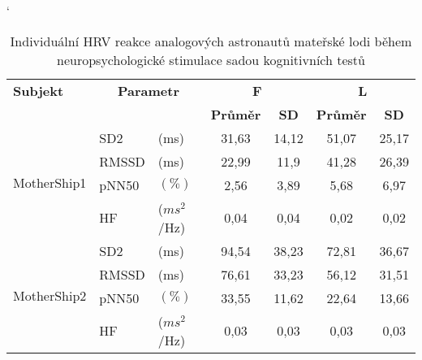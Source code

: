 \begin{table}[h]
    \catcode`
    \footnotesize
    \centering
    \caption{Individuální HRV reakce analogových astronautů mateřské lodi během neuropsychologické stimulace sadou kognitivních testů}
    \begin{threeparttable}
        \begin{tabular*}{\linewidth}{@{\extracolsep{\fill}} lllcccc @{}}
            \toprule
            \textbf{Subjekt}                & \multicolumn{2}{c}{\textbf{Parametr}} & \multicolumn{2}{c}{\textbf{F}} & \multicolumn{2}{c}{\textbf{L}}                                               \\ \cmidrule(rl){4-5} \cmidrule(rl){6-7}
            &                                       &                                & \textbf{Průměr}                & \textbf{SD} & \textbf{Průměr} & \textbf{SD} \\ \midrule
            \multirow[t]{4}{*}{MotherShip1} & SD2                                  & (ms)                           & 31,63                          & 14,12          & 51,07           & 25,17       \\
            & RMSSD                                 & (ms)                           & 22,99                          & 11,9        & 41,28           & 26,39       \\
            & pNN50                                 & $(\%)$                         & 2,56                           & 3,89        & 5,68            & 6,97        \\
            & HF                                    & ($ms^2$/Hz)                    & 0,04                           & 0,04        & 0,02            & 0,02        \\ \midrule
            \multirow[t]{4}{*}{MotherShip2} & SD2                                  & (ms)                           & 94,54                          & 38,23       & 72,81           & 36,67       \\
            & RMSSD                                 & (ms)                           & 76,61                           & 33,23       & 56,12            & 31,51       \\
            & pNN50                                 & $(\%)$                         & 33,55                          & 11,62       & 22,64           & 13,66       \\
            & HF                                    & ($ms^2$/Hz)                    & 0,03                           & 0,03        & 0,03            & 0,03        \\ \midrule

\end{tabular*}
\end{threeparttable}
\end{table}
